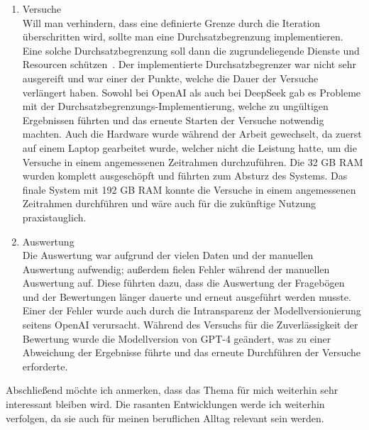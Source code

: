 \begin{enumerate}
    \item{Versuche}\\
    Will man verhindern, dass eine definierte Grenze durch die Iteration überschritten wird, sollte man eine Durchsatzbegrenzung implementieren.
    Eine solche Durchsatzbegrenzung soll dann die zugrundeliegende Dienste und Resourcen schützen~\cite{BuiltinRateLimiter}.
    Der implementierte Durchsatzbegrenzer war nicht sehr ausgereift und war einer der Punkte, welche die Dauer der Versuche verlängert haben.
    Sowohl bei OpenAI als auch bei DeepSeek gab es Probleme mit der Durchsatzbegrenzungs-Implementierung, welche zu ungültigen Ergebnissen führten und das erneute Starten der Versuche notwendig machten.
    Auch die Hardware wurde während der Arbeit gewechselt, da zuerst auf einem Laptop gearbeitet wurde, welcher nicht die Leistung hatte, um die Versuche in einem angemessenen Zeitrahmen durchzuführen.
    Die 32 GB RAM wurden komplett ausgeschöpft und führten zum Absturz des Systems.
    Das finale System mit 192 GB RAM konnte die Versuche in einem angemessenen Zeitrahmen durchführen und wäre auch für die zukünftige Nutzung praxistauglich.

    \item{Auswertung}\\
    Die Auswertung war aufgrund der vielen Daten und der manuellen Auswertung aufwendig; außerdem fielen Fehler während der manuellen Auswertung auf.
    Diese führten dazu, dass die Auswertung der Fragebögen und der Bewertungen länger dauerte und erneut ausgeführt werden musste.
    Einer der Fehler wurde auch durch die Intransparenz der Modellversionierung seitens OpenAI verursacht.
    Während des Versuchs für die Zuverlässigkeit der Bewertung wurde die Modellversion von GPT-4 geändert, was zu einer Abweichung der Ergebnisse führte und das erneute Durchführen der Versuche erforderte.

\end{enumerate}

Abschließend möchte ich anmerken, dass das Thema für mich weiterhin sehr interessant bleiben wird.
Die rasanten Entwicklungen werde ich weiterhin verfolgen, da sie auch für meinen beruflichen Alltag relevant sein werden.